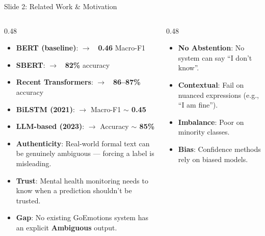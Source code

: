 \documentclass[aspectratio=169]{beamer}
\begin{document}
\begin{frame}[label=slide2]{Slide 2: Related Work \& Motivation}
\vspace*{-0.4cm}
\begin{columns}[T]
\begin{column}{0.48\textwidth}
\begin{tcolorbox}[mybox,title=What Others Have Done,height=3.6cm]
\scriptsize
\begin{itemize}
    \item \textbf{BERT (baseline)}: $\to$ \textbf{~0.46} Macro-F1
    \item \textbf{SBERT}: $\to$ \textbf{~82\%} accuracy
    \item \textbf{Recent Transformers}: $\to$ \textbf{~86--87\%} accuracy
    \item \textbf{BiLSTM (2021)}: $\to$ Macro-F1 \textbf{$\sim$ 0.45}
    \item \textbf{LLM-based (2023)}: $\to$ Accuracy \textbf{$\sim$ 85\%}
\end{itemize}
\end{tcolorbox}

\vspace*{-0.1cm}

\begin{tcolorbox}[mybox,title=Why Your Project is Needed,height=3.6cm]
\scriptsize
\begin{itemize}
    \item \textbf{Authenticity}: Real-world formal text can be genuinely ambiguous --- forcing a label is misleading.
    \item \textbf{Trust}: Mental health monitoring needs to know when a prediction shouldn't be trusted.
    \item \textbf{Gap}: No existing GoEmotions system has an explicit \textbf{Ambiguous} output.
\end{itemize}
\end{tcolorbox}
\end{column}

\begin{column}{0.48\textwidth}
\begin{tcolorbox}[mybox,title=Problems with Existing Work,height=3.6cm]
\scriptsize
\begin{itemize}
    \item \textbf{No Abstention}: No system can say ``I don't know''.
    \item \textbf{Contextual}: Fail on nuanced expressions (e.g., ``I am fine'').
    \item \textbf{Imbalance}: Poor on minority classes.
    \item \textbf{Bias}: Confidence methods rely on biased models.
\end{itemize}
\end{tcolorbox}


\end{column}
\end{columns}
\end{frame}
\end{document}
